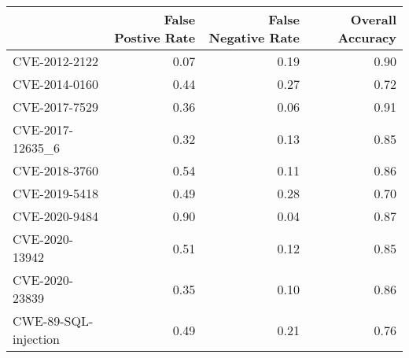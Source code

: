 \begin{tabular}{lrrr}
\toprule
{} &  False Postive Rate &  False Negative Rate &  Overall Accuracy \\
\midrule
CVE-2012-2122        &                0.07 &                 0.19 &              0.90 \\
CVE-2014-0160        &                0.44 &                 0.27 &              0.72 \\
CVE-2017-7529        &                0.36 &                 0.06 &              0.91 \\
CVE-2017-12635\_6     &                0.32 &                 0.13 &              0.85 \\
CVE-2018-3760        &                0.54 &                 0.11 &              0.86 \\
CVE-2019-5418        &                0.49 &                 0.28 &              0.70 \\
CVE-2020-9484        &                0.90 &                 0.04 &              0.87 \\
CVE-2020-13942       &                0.51 &                 0.12 &              0.85 \\
CVE-2020-23839       &                0.35 &                 0.10 &              0.86 \\
CWE-89-SQL-injection &                0.49 &                 0.21 &              0.76 \\
\bottomrule
\end{tabular}
